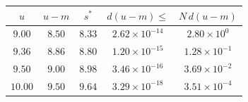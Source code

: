 \begin{tabular}{@{}ccccc@{}}
\toprule
$u$ & $u-m$ & $s^{*}$ & $d(u-m)\le$ & $N\,d(u-m)$\\
\midrule
$9.00$ & $8.50$ & $8.33$ & $2.62\times10^{-14}$ & $2.80\times10^{0}$\\
$9.36$ & $8.86$ & $8.80$ & $1.20\times10^{-15}$ & $1.28\times10^{-1}$\\
$9.50$ & $9.00$ & $8.98$ & $3.46\times10^{-16}$ & $3.69\times10^{-2}$\\
$10.00$ & $9.50$ & $9.64$ & $3.29\times10^{-18}$ & $3.51\times10^{-4}$\\
\bottomrule
\end{tabular}
